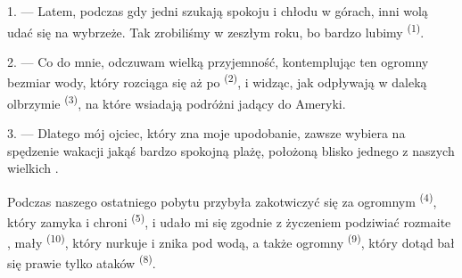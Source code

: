 %
%
%

\VUsaut{4.0mm}
\VUsaut{3.0mm}
\VUsaut{3.0mm}

1. --- Latem, podczas gdy jedni szukają spokoju i chłodu w górach, inni wolą udać się na
wybrzeże. Tak zrobiliśmy w zeszłym roku, bo bardzo lubimy 
\textsuperscript{(1)}.

2. --- Co do mnie, odczuwam wielką przyjemność, kontemplując ten ogromny bezmiar wody,
który rozciąga się aż po  \textsuperscript{(2)}, i widząc, jak odpływają
w daleką  olbrzymie  \textsuperscript{(3)}, na które
wsiadają podróżni jadący do Ameryki.

3. --- Dlatego mój ojciec, który zna moje upodobanie, zawsze wybiera na spędzenie
wakacji jakąś bardzo spokojną plażę, położoną blisko jednego z naszych wielkich
.

Podczas naszego ostatniego pobytu  przybyła zakotwiczyć się za ogromnym
 \textsuperscript{(4)}, który zamyka i chroni 
\textsuperscript{(5)}, i udało mi się zgodnie z życzeniem podziwiać rozmaite
, mały  \textsuperscript{(10)}, który
nurkuje i znika pod wodą, a także ogromny  \textsuperscript{(9)},
który dotąd bał się prawie tylko ataków  \textsuperscript{(8)}.

